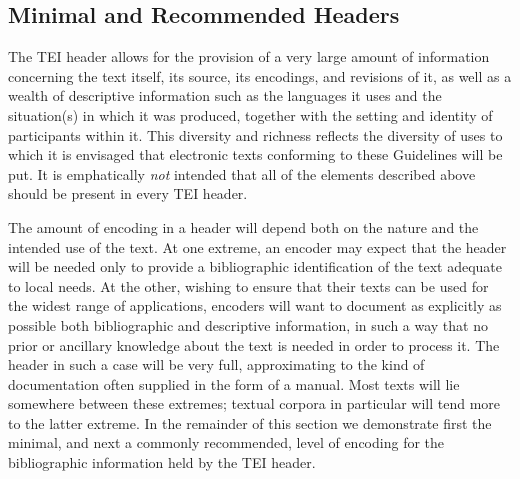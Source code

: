 \subsection[{Minimal and Recommended Headers}]{Minimal and Recommended Headers}\label{HD7}\par
The TEI header allows for the provision of a very large amount of information concerning the text itself, its source, its encodings, and revisions of it, as well as a wealth of descriptive information such as the languages it uses and the situation(s) in which it was produced, together with the setting and identity of participants within it. This diversity and richness reflects the diversity of uses to which it is envisaged that electronic texts conforming to these Guidelines will be put. It is emphatically \textit{not} intended that all of the elements described above should be present in every TEI header.\par
The amount of encoding in a header will depend both on the nature and the intended use of the text. At one extreme, an encoder may expect that the header will be needed only to provide a bibliographic identification of the text adequate to local needs. At the other, wishing to ensure that their texts can be used for the widest range of applications, encoders will want to document as explicitly as possible both bibliographic and descriptive information, in such a way that no prior or ancillary knowledge about the text is needed in order to process it. The header in such a case will be very full, approximating to the kind of documentation often supplied in the form of a manual. Most texts will lie somewhere between these extremes; textual corpora in particular will tend more to the latter extreme. In the remainder of this section we demonstrate first the minimal, and next a commonly recommended, level of encoding for the bibliographic information held by the TEI header.\par
